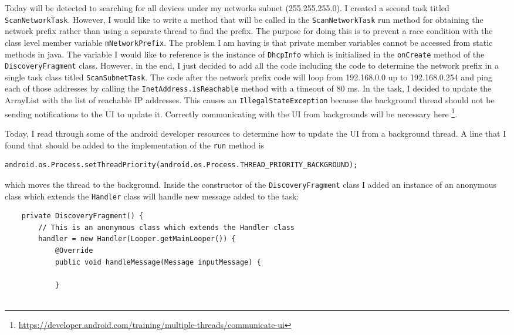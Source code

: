\documentclass[fontsize=11pt, %
                             paper=a4, %
                             twoside, %
                             captions=tableheading,
                             index=totoc,
                             hyperref]{labbook}
\begin{document}
\begin{addmargin}[0cm]{0cm}
Today will be detected to searching for all devices under my networks subnet (255.255.255.0). I created a second task titled \texttt{ScanNetworkTask}. However, I would like to write a method that will be called in the \texttt{ScanNetworkTask} run method for obtaining the network prefix rather than using a separate thread to find the prefix. The purpose for doing this is to prevent a race condition with the class level member variable \texttt{mNetworkPrefix}. The problem I am having is that private member variables cannot be accessed from static methods in java. The variable I would like to reference is the instance of \texttt{DhcpInfo} which is initialized in the \texttt{onCreate} method of the \texttt{DiscoveryFragment} class. However, in the end, I just decided to add all the code including the code to determine the network prefix in a single task class titled \texttt{ScanSubnetTask}. The code after the network prefix code will loop from 192.168.0.0 up to 192.168.0.254 and ping each of those addresses by calling the \texttt{InetAddress.isReachable} method with a timeout of 80 ms. In the task, I decided to update the ArrayList with the list of reachable IP addresses. This causes an \texttt{IllegalStateException} because the background thread should not be sending notifications to the UI to update it. Correctly communicating with the UI from backgrounds will be necessary here \footnote{\url{https://developer.android.com/training/multiple-threads/communicate-ui}}.

Today, I read through some of the android developer resources to determine how to update the UI from a background thread. A line that I found that should be added to the implementation of the \texttt{run} method is
\begin{Verbatim}
android.os.Process.setThreadPriority(android.os.Process.THREAD_PRIORITY_BACKGROUND);
\end{Verbatim}
which moves the thread to the background. Inside the constructor of the \texttt{DiscoveryFragment} class I added an instance of an anonymous class which extends the \texttt{Handler} class will handle new message added to the task:
\begin{Verbatim}
    private DiscoveryFragment() {
        // This is an anonymous class which extends the Handler class
        handler = new Handler(Looper.getMainLooper()) {
            @Override
            public void handleMessage(Message inputMessage) {

            }


\end{Verbatim}
\end{addmargin}
\end{document}
